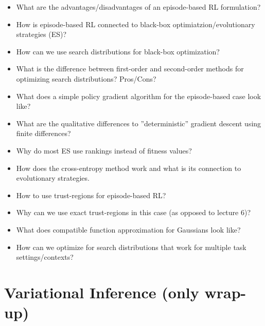 \documentclass[11pt]{scrartcl}
\begin{document}
\begin{itemize}
    \item What are the advantages/disadvantages of an episode-based RL formulation?
    \item How is episode-based RL connected to black-box optimiatzion/evolutionary strategies (ES)?
    \item How can we use search distributions for black-box optimization?
    \item What is the difference between first-order and second-order methods for optimizing search 
    distributions? Pros/Cons?
    \item What does a simple policy gradient algorithm for the episode-based case look like?
    \item What are the qualitative differences to ''deterministic'' gradient descent using finite differences?
    \item Why do most ES use rankings instead of fitness values?
    \item How does the cross-entropy method work and what is its connection to evolutionary strategies.
    \item How to use trust-regions for episode-based RL?
    \item Why can we use exact trust-regions in this case (as opposed to lecture 6)?
    \item What does compatible function approximation for Gaussians look like?
    \item How can we optimize for search distributions that work for multiple task settings/contexts?
\end{itemize}

\section{Variational Inference (only wrap-up)}
\end{document}
